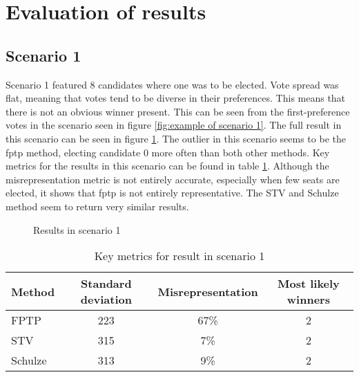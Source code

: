 \documentclass[12pt]{article}
\begin{document}
\section{Evaluation of results}
\subsection{Scenario 1}
Scenario 1 featured 8 candidates where one was to be elected. Vote spread was flat, meaning that votes tend to be diverse in their preferences. This means that there is not an obvious winner present. This can be seen from the first-preference votes in the scenario seen in figure \ref{fig:example of scenario 1}. The full result in this scenario can be seen in figure \ref{fig:scenario 1 results}. The outlier in this scenario seems to be the fptp method, electing candidate 0 more often than both other methods. Key metrics for the results in this scenario can be found in table \ref{tab:scenario 1 result}. Although the misrepresentation metric is not entirely accurate, especially when few seats are elected, it shows that fptp is not entirely representative. The STV and Schulze method seem to return very similar results.
\begin{figure}
	\centering
	\caption{Results in scenario 1}
	\label{fig:scenario 1 results}
\end{figure}

\begin{table}
\centering
\caption{Key metrics for result in scenario 1}
\label{tab:scenario 1 result}
\begin{tabular}{@{}lccc@{}}
\toprule
Method & Standard deviation & Misrepresentation & Most likely winners \\ \midrule
FPTP & 223 & 67\% & 2 \\
STV & 315 & 7\% & 2 \\
Schulze & 313 & 9\% & 2 \\ \bottomrule
\end{tabular}
\end{table}
\end{document}
